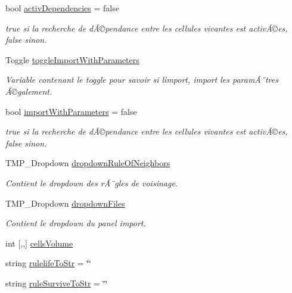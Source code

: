 \begin{DoxyCompactItemize}
bool \mbox{\hyperlink{class_parameters_a69b261ceea3746beb517d7082a8fc810}{activ\+Dependencies}} = false
\begin{DoxyCompactList}\small\item\em true si la recherche de dÃ©pendance entre les cellules vivantes est activÃ©es, false sinon. \end{DoxyCompactList}\item 
Toggle \mbox{\hyperlink{class_parameters_a1de1921a55ef745c4ab25ac46a98c1d8}{toggle\+Import\+With\+Parameters}}
\begin{DoxyCompactList}\small\item\em Variable contenant le toggle pour savoir si l\textquotesingle{}import, import les paramÃ¨tres Ã©galement. \end{DoxyCompactList}\item 
bool \mbox{\hyperlink{class_parameters_a2b7e1fe1403da019b5762792e4ea302b}{import\+With\+Parameters}} = false
\begin{DoxyCompactList}\small\item\em true si la recherche de dÃ©pendance entre les cellules vivantes est activÃ©es, false sinon. \end{DoxyCompactList}\item 
T\+M\+P\+\_\+\+Dropdown \mbox{\hyperlink{class_parameters_a9bb907abb659026dbf7b4f64343aefa1}{dropdown\+Rule\+Of\+Neighbors}}
\begin{DoxyCompactList}\small\item\em Contient le dropdown des rÃ¨gles de voisinage. \end{DoxyCompactList}\item 
T\+M\+P\+\_\+\+Dropdown \mbox{\hyperlink{class_parameters_ae4cea23bda0b2bc3955516a37e9d9993}{dropdown\+Files}}
\begin{DoxyCompactList}\small\item\em Contient le dropdown du panel import. \end{DoxyCompactList}\item 
int \mbox{[},,\mbox{]} \mbox{\hyperlink{class_parameters_a0d8550932a58f49a60370eec0c4700d1}{cells\+Volume}}
\item 
string \mbox{\hyperlink{class_parameters_a83b35077082784a379d79db7e1b96e06}{rulelife\+To\+Str}} = \char`\"{}\char`\"{}
\item 
string \mbox{\hyperlink{class_parameters_a89dcaef13a4d9b7a41631b16c2e901a7}{rule\+Survive\+To\+Str}} = \char`\"{}\char`\"{}
\end{DoxyCompactItemize}


